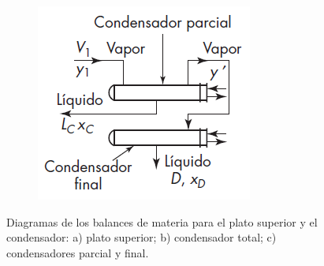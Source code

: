 \documentclass[11pt]{book}
\begin{document}
\begin{figure}
\begin{subfigure}[b]{0.3\textwidth}
    \caption{ }
    \label{Fig:PlatoSuperior_B}
  \end{subfigure}
  \begin{subfigure}[b]{0.3\textwidth}
    \includegraphics[width=\textwidth]{img/destilacion/PlatoSuperior_C.PNG}
    \caption{ }
    \label{Fig:PlatoSuperior_C}
  \end{subfigure}
  \caption{Diagramas de los balances de materia para el plato superior y el condensador: a) plato superior; b) condensador total; c) condensadores parcial y final.}
  \label{Fig:PlatoSuperior}
\end{figure}
\end{document}

